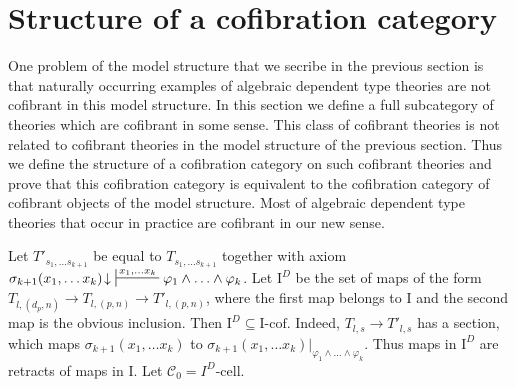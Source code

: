 \documentclass[reqno]{amsart}
\theoremstyle{definition}
\theoremstyle{remark}
\newcommand{\cof}{\mathcal{C}}
\newcommand{\I}{\mathrm{I}}
\newcommand{\class}[2]{#1\text{-}\mathrm{#2}}
\newcommand{\Icell}[1][\I]{\class{#1}{cell}}
\newcommand{\Icof}[1][\I]{\class{#1}{cof}}
\numberwithin{figure}{section}
\begin{document}
\section{Structure of a cofibration category}

One problem of the model structure that we secribe in the previous section is that
naturally occurring examples of algebraic dependent type theories are not cofibrant in this model structure.
In this section we define a full subcategory of theories which are cofibrant in some sense.
This class of cofibrant theories is not related to cofibrant theories in the model structure of the previous section.
Thus we define the structure of a cofibration category on such cofibrant theories and
prove that this cofibration category is equivalent to the cofibration category of cofibrant objects of the model structure.
Most of algebraic dependent type theories that occur in practice are cofibrant in our new sense.

Let $T'_{s_1, \ldots s_{k+1}}$ be equal to $T_{s_1, \ldots s_{k+1}}$ together with axiom
$\sigma_{k+1}(x_1, \ldots x_k)\!\downarrow\ \sststile{}{x_1, \ldots x_k} \varphi_1 \land \ldots \land \varphi_k$.
Let $\I^D$ be the set of maps of the form $T_{l, (d_p,n)} \to T_{l, (p,n)} \to T'_{l, (p,n)}$, where the first map belongs to $\I$ and the second map is the obvious inclusion.
Then $\I^D \subseteq \Icof$.
Indeed, $T_{l,s} \to T'_{l,s}$ has a section, which maps $\sigma_{k+1}(x_1, \ldots x_k)$ to $\sigma_{k+1}(x_1, \ldots x_k)|_{\varphi_1 \land \ldots \land \varphi_k}$.
Thus maps in $\I^D$ are retracts of maps in $\I$.
Let $\cof_0 = \Icell[I^D]$.
\end{document}
